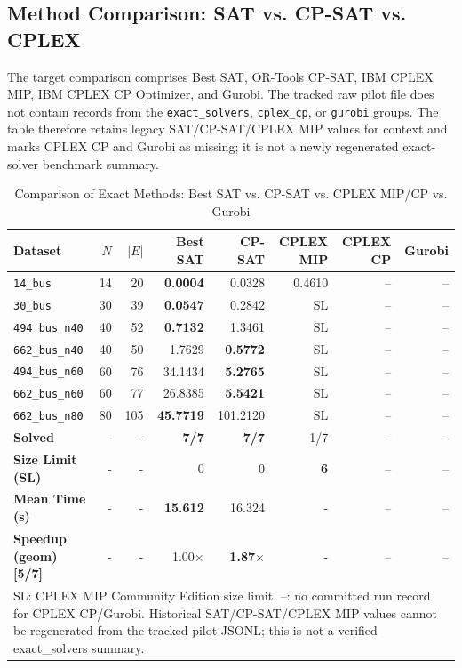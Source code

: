 \documentclass[a4paper,fleqn]{cas-sc}
\begin{document}
\subsection{Method Comparison: SAT vs. CP-SAT vs. CPLEX}
The target comparison comprises Best SAT, OR-Tools CP-SAT, IBM CPLEX MIP, IBM CPLEX CP Optimizer, and Gurobi. The tracked raw pilot file does not contain records from the \texttt{exact\_solvers}, \texttt{cplex\_cp}, or \texttt{gurobi} groups. The table therefore retains legacy SAT/CP-SAT/CPLEX MIP values for context and marks CPLEX CP and Gurobi as missing; it is not a newly regenerated exact-solver benchmark summary.

\begin{table}
\centering
\caption{Comparison of Exact Methods: Best SAT vs. CP-SAT vs. CPLEX MIP/CP vs. Gurobi}
\label{tab:table_methods}
\begin{tabular}{lrrrrrrr}
\toprule
Dataset & $N$ & $|E|$ & Best SAT & CP-SAT & CPLEX MIP & CPLEX CP & Gurobi \\
\midrule
\texttt{14\_bus} & 14 & 20 & \textbf{0.0004} & 0.0328 & 0.4610 & -- & -- \\
\texttt{30\_bus} & 30 & 39 & \textbf{0.0547} & 0.2842 & SL & -- & -- \\
\texttt{494\_bus\_n40} & 40 & 52 & \textbf{0.7132} & 1.3461 & SL & -- & -- \\
\texttt{662\_bus\_n40} & 40 & 50 & 1.7629 & \textbf{0.5772} & SL & -- & -- \\
\texttt{494\_bus\_n60} & 60 & 76 & 34.1434 & \textbf{5.2765} & SL & -- & -- \\
\texttt{662\_bus\_n60} & 60 & 77 & 26.8385 & \textbf{5.5421} & SL & -- & -- \\
\texttt{662\_bus\_n80} & 80 & 105 & \textbf{45.7719} & 101.2120 & SL & -- & -- \\
\midrule
\textbf{Solved} & - & - & \textbf{7/7} & \textbf{7/7} & 1/7 & -- & -- \\
\textbf{Size Limit (SL)} & - & - & 0 & 0 & \textbf{6} & -- & -- \\
\textbf{Mean Time (s)} & - & - & \textbf{15.612} & 16.324 & - & -- & -- \\
\textbf{Speedup (geom) [5/7]} & - & - & 1.00$\times$ & \textbf{1.87$\times$} & - & -- & -- \\
\bottomrule
\multicolumn{8}{l}{\footnotesize SL: CPLEX MIP Community Edition size limit. --: no committed run record for CPLEX CP/Gurobi. Historical SAT/CP-SAT/CPLEX MIP values cannot be regenerated from the tracked pilot JSONL; this is not a verified exact\_solvers summary.} \\
\end{tabular}
\end{table}
\end{document}
